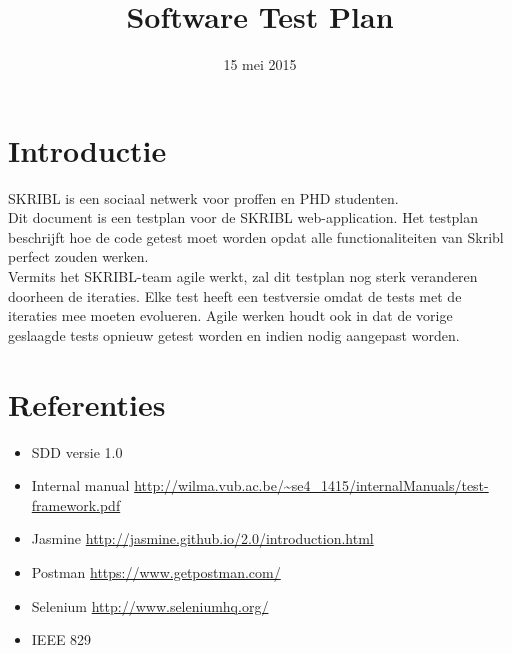 \documentclass{article}
\title{Software Test Plan}
\author{} %
\date{15 mei 2015} %
\begin{document}




\tableofcontents
\newpage


\section{Introductie}
SKRIBL is een sociaal netwerk voor proffen en PHD studenten.
\\
Dit document is een testplan voor de SKRIBL web-application.  
Het testplan beschrijft hoe de code getest moet worden opdat alle functionaliteiten van Skribl perfect zouden werken.
\\
Vermits het SKRIBL-team agile werkt, zal dit testplan nog sterk veranderen doorheen de iteraties. Elke test heeft een testversie omdat de tests met de iteraties mee moeten evolueren. Agile werken houdt ook in dat de vorige geslaagde tests opnieuw getest  worden en indien nodig aangepast worden.

\section{Referenties}
\begingroup
\renewcommand{\section}[2]{}%

\endgroup
\begin{itemize}
  \item SDD versie 1.0
  \item Internal manual \url{http://wilma.vub.ac.be/~se4_1415/internalManuals/test-framework.pdf}
  \item Jasmine \url{http://jasmine.github.io/2.0/introduction.html}
  \item Postman \url{https://www.getpostman.com/}
  \item Selenium \url{http://www.seleniumhq.org/}
  \item IEEE 829
\end{itemize}
\end{document}
